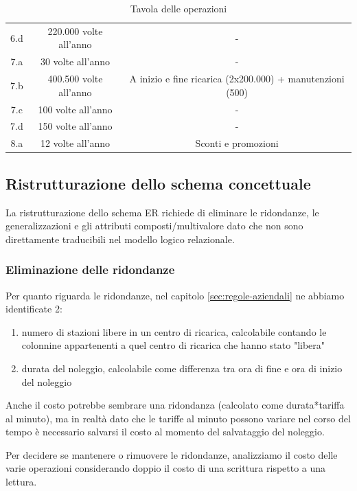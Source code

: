 \documentclass{article}
\begin{document}
\begin{table}[H]
\begin{tabular}{|c|c|c|}
        6.d & 220.000 volte all'anno & - \\
        7.a & 30 volte all'anno & -\\
        7.b & 400.500 volte all'anno & A inizio e fine ricarica (2x200.000) + manutenzioni (500) \\
        7.c & 100 volte all'anno & - \\
        7.d & 150 volte all'anno & - \\
        8.a & 12 volte all'anno & Sconti e promozioni \\
        \hline
    \end{tabular}
    \caption{Tavola delle operazioni}
    \label{tab:Tavola delle operazioni}
\end{table}


\subsection{Ristrutturazione dello schema concettuale}

La ristrutturazione dello schema ER richiede di eliminare le ridondanze, le generalizzazioni e gli attributi composti/multivalore dato che non sono direttamente traducibili nel modello logico relazionale. 


\subsubsection{Eliminazione delle ridondanze}
Per quanto riguarda le ridondanze, nel capitolo \ref{sec:regole-aziendali} ne abbiamo identificate 2:

\begin{enumerate}
    \item numero di stazioni libere in un centro di ricarica, calcolabile contando le colonnine appartenenti a quel centro di ricarica che hanno stato "libera"
    \item durata del noleggio, calcolabile come differenza tra ora di fine e ora di inizio del noleggio
\end{enumerate}

Anche il costo potrebbe sembrare una ridondanza (calcolato come durata*tariffa al minuto), ma in realtà dato che le tariffe al minuto possono variare nel corso del tempo è necessario salvarsi il costo al momento del salvataggio del noleggio.

Per decidere se mantenere o rimuovere le ridondanze, analizziamo il costo delle varie operazioni considerando doppio il costo di una scrittura rispetto a una lettura.
\end{document}
